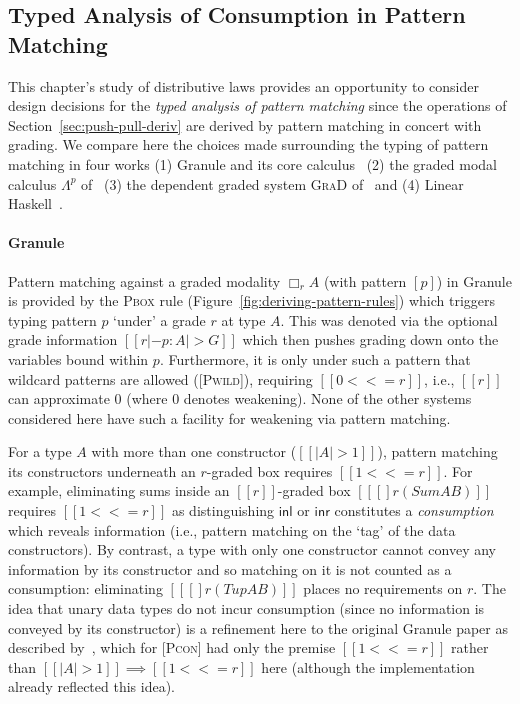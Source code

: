 \subsection{Typed Analysis of Consumption in Pattern Matching}
\label{subsec:matching-and-consumption}

\newcommand{\abname}{$\Lambda^p$}
\newcommand{\gradname}{\textsc{GraD}}

This chapter's study of distributive laws provides
an opportunity to consider design decisions for the \emph{typed
  analysis of pattern matching} since the operations of
Section~\ref{sec:push-pull-deriv} are derived by pattern matching in concert
with grading. We compare here the choices made surrounding the typing of
pattern matching in four works (1) Granule and
its core calculus~\citep{DBLP:journals/pacmpl/OrchardLE19} (2) the graded
modal calculus \abname{} of~\citet{DBLP:journals/pacmpl/AbelB20} (3) the dependent graded system
\gradname{} of~\citet{DBLP:journals/pacmpl/ChoudhuryEEW21} and (4) Linear
Haskell~\citep{DBLP:journals/pacmpl/BernardyBNJS18}.

\paragraph{Granule}
%
Pattern matching against a graded modality $\Box_r A$ (with pattern
$[p]$) in Granule is provided by the \textsc{Pbox} rule
(Figure~\ref{fig:deriving-pattern-rules}) which triggers typing pattern $p$
`under' a grade $r$ at type $A$. This was denoted via the optional grade information
$[[ r |- p : A |> G ]]$ which then pushes grading down onto the
variables bound within $p$. Furthermore, it is only under such a
pattern that wildcard patterns are allowed (\textsc{[Pwild]}),
requiring $[[ 0 <<= r]]$, i.e., $[[ r ]]$ can approximate
$0$ (where $0$ denotes weakening).
None of the other systems considered here have such a facility
for weakening via pattern matching.

For a type $A$ with more than one
  constructor ($[[ | A | > 1 ]]$), pattern matching its
  constructors underneath an $r$-graded box requires $[[ 1 <<=
  r]]$. For example, eliminating sums inside an $[[r]]$-graded box
$[[ [] r (Sum A B) ]]$ requires $[[ 1 <<= r ]]$ as
distinguishing $\mathsf{inl}$ or $\mathsf{inr}$
constitutes a \emph{consumption} which reveals information (i.e.,
pattern matching on the `tag' of the data constructors).
By contrast, a type with only one constructor cannot convey any information
by its constructor and so matching on it is not counted as a consumption:
eliminating $[[ [] r (Tup A B) ]]$ places no
requirements on $r$.
The idea that unary data types do not incur consumption (since no
information is conveyed by its constructor) is a refinement here to the
original Granule paper as described by~\citet{DBLP:journals/pacmpl/OrchardLE19}, which for \textsc{[Pcon]}
had only the premise $[[ 1 <<= r]]$ rather than
$[[ | A | > 1 ]] \implies [[ 1 <<= r ]]$ here (although the
implementation already reflected this idea).

